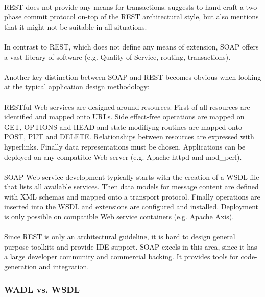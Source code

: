\\
REST does not provide any means for transactions. \cite{RESTFULWEB} suggests to hand craft a two phase commit protocol on-top of the REST architectural style, but also mentions that it might not be suitable in all situations.
\\ \\
In contrast to REST, which does not define any means of extension, SOAP offers a vast library of software (e.g. Quality of Service, routing, transactions).
\\ \\
Another key distinction between SOAP and REST becomes obvious when looking at the typical application design methodology: 
\\ \\
RESTful Web services are designed around resources. First of all resources are identified and mapped onto URLs. Side effect-free operations are mapped on GET, OPTIONS and HEAD and state-modifiyng routines are mapped onto POST, PUT and DELETE. Relationships between resources are expressed with hyperlinks. Finally data representations must be chosen. Applications can be deployed on any compatible Web server (e.g. Apache httpd and mod\_perl). \cite{BIGREST}
\\ \\
SOAP Web service development typically starts with the creation of a WSDL file that lists all available services. Then data models for message content are defined with XML schemas and mapped onto a transport protocol. Finally operations are inserted into the WSDL and extensions are configured and installed. Deployment is only possible on compatible Web service containers (e.g. Apache Axis). \cite{BRINGBACKWEB}
\\ \\
Since REST is only an architectural guideline, it is hard to design general purpose toolkits and provide IDE-support. SOAP excels in this area, since it has a large developer community and commercial backing. It provides tools for code-generation and integration. 

\subsubsection*{WADL vs. WSDL}


